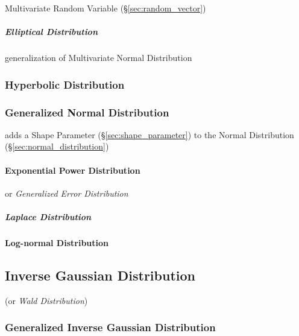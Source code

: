 Multivariate Random Variable (\S\ref{sec:random_vector})



\subparagraph{Elliptical Distribution}\label{sec:elliptical_distribution}
\hfill

generalization of Multivariate Normal Distribution



\subsubsection{Hyperbolic Distribution}\label{sec:hyperbolic_distribution}

\subsubsection{Generalized Normal Distribution}\label{sec:generalized_normal}

adds a Shape Parameter (\S\ref{sec:shape_parameter}) to the Normal Distribution
(\S\ref{sec:normal_distribution})



\paragraph{Exponential Power Distribution}\label{sec:exponential_power}\hfill

or \emph{Generalized Error Distribution}



\subparagraph{Laplace Distribution}\label{sec:laplace_distribution}\hfill



\paragraph{Log-normal Distribution}\label{sec:lognormal_distribution}\hfill



\subsection{Inverse Gaussian Distribution}\label{sec:inverse_gaussian}

(or \emph{Wald Distribution})



\subsubsection{Generalized Inverse Gaussian Distribution}
\label{sec:generalized_inverse_gaussian}



